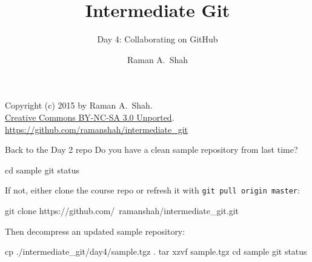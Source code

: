 

\title{Intermediate Git}
\subtitle{Day 4: Collaborating on GitHub}
\author{Raman A.~Shah}
\date{}



\begin{frame}[plain]
  \titlepage
  \footnotesize{Copyright (c) 2015 by Raman A.~Shah.\\
  \href{https://creativecommons.org/licenses/by-nc-sa/3.0/legalcode}
       {Creative Commons BY-NC-SA 3.0 Unported}.\\
   \href{https://github.com/ramanshah/intermediate\_git}
        {https://github.com/ramanshah/intermediate\_git}}
\end{frame}

\begin{frame}[fragile]{Back to the Day 2 repo}
  Do you have a clean sample repository from last time?

  \begin{gitCommand}
cd sample
git status
  \end{gitCommand}

  If not, either clone the course repo or refresh it with
  \texttt{git pull origin master}:

  \begin{gitCommand}
git clone https://github.com/\
ramanshah/intermediate_git.git
  \end{gitCommand}

  Then decompress an updated sample repository:

  \begin{gitCommand}
cp ./intermediate_git/day4/sample.tgz .
tar xzvf sample.tgz
cd sample
git status
  \end{gitCommand}
\end{frame}

